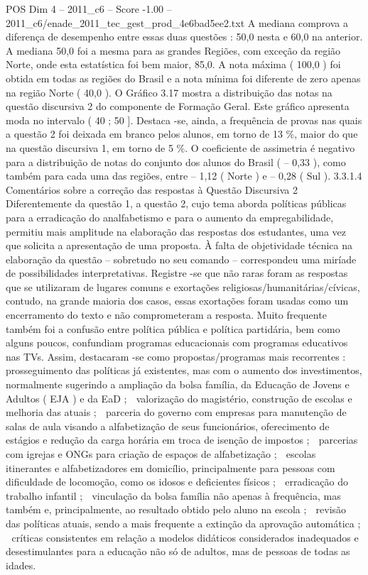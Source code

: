\begin{textsample}{POS Dim 4 – 2011\_c6 – Score -1.00 – 2011\_c6/enade\_2011\_tec\_gest\_prod\_4e6bad5ee2.txt}
A mediana comprova a diferença de desempenho entre essas duas questões : 50,0 nesta e 60,0 na anterior.
A mediana 50,0 foi a mesma para as grandes Regiões, com exceção da região Norte, onde esta estatística foi bem maior, 85,0.
A nota máxima ( 100,0 ) foi obtida em todas as regiões do Brasil e a nota mínima foi diferente de zero apenas na região Norte ( 40,0 ).
O Gráfico 3.17 mostra a distribuição das notas na questão discursiva 2 do componente de Formação Geral.
Este gráfico apresenta moda no intervalo ( 40 ; 50 ].
Destaca -se, ainda, a frequência de provas nas quais a questão 2 foi deixada em branco pelos alunos, em torno de 13 \%, maior do que na questão discursiva 1, em torno de 5 \%.
O coeficiente de assimetria é negativo para a distribuição de notas do conjunto dos alunos do Brasil ( – 0,33 ), como também para cada uma das regiões, entre – 1,12 ( Norte ) e – 0,28 ( Sul ). 3.3.1.4 Comentários sobre a correção das respostas à Questão Discursiva 2 Diferentemente da questão 1, a questão 2, cujo tema aborda políticas públicas para a erradicação do analfabetismo e para o aumento da empregabilidade, permitiu mais amplitude na elaboração das respostas dos estudantes, uma vez que solicita a apresentação de uma proposta.
À falta de objetividade técnica na elaboração da questão – sobretudo no seu comando – correspondeu uma miríade de possibilidades interpretativas.
Registre -se que não raras foram as respostas que se utilizaram de lugares comuns e exortações religiosas/humanitárias/cívicas, contudo, na grande maioria dos casos, essas exortações foram usadas como um encerramento do texto e não comprometeram a resposta.
Muito frequente também foi a confusão entre política pública e política partidária, bem como alguns poucos, confundiam programas educacionais com programas educativos nas TVs.
Assim, destacaram -se como propostas/programas mais recorrentes :  prosseguimento das políticas já existentes, mas com o aumento dos investimentos, normalmente sugerindo a ampliação da bolsa família, da Educação de Jovens e Adultos ( EJA ) e da EaD ;  valorização do magistério, construção de escolas e melhoria das atuais ;  parceria do governo com empresas para manutenção de salas de aula visando a alfabetização de seus funcionários, oferecimento de estágios e redução da carga horária em troca de isenção de impostos ;  parcerias com igrejas e ONGs para criação de espaços de alfabetização ;  escolas itinerantes e alfabetizadores em domicílio, principalmente para pessoas com dificuldade de locomoção, como os idosos e deficientes físicos ;  erradicação do trabalho infantil ;  vinculação da bolsa família não apenas à frequência, mas também e, principalmente, ao resultado obtido pelo aluno na escola ;  revisão das políticas atuais, sendo a mais frequente a extinção da aprovação automática ;  críticas consistentes em relação a modelos didáticos considerados inadequados e desestimulantes para a educação não só de adultos, mas de pessoas de todas as idades.

\end{textsample}
